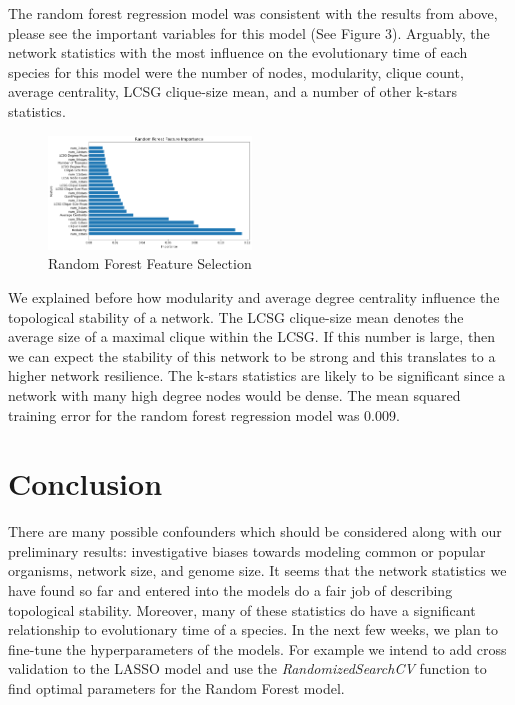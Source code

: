 \documentclass[12pt]{article}
\begin{document}
The random forest regression model was consistent with the results from above, please see the important variables for this model (See Figure 3). Arguably, the network statistics with the most influence on the evolutionary time of each species for this model were the number of nodes, modularity, clique count, average centrality, LCSG clique-size mean, and a number of other k-stars statistics. 
\begin{figure}
  \vspace{-20pt}
  \begin{center}
    \includegraphics[width=0.48\textwidth]{PPIN_fig2}
  \end{center}
  \vspace{-20pt}
  \caption{Random Forest Feature Selection}
  \vspace{-10pt}
\end{figure}

We explained before how modularity and average degree centrality influence the topological stability of a network. The LCSG clique-size mean denotes the average size of a maximal clique within the LCSG. If this number is large, then we can expect the stability of this network to be strong and this translates to a higher network resilience. The k-stars statistics are likely to be significant since a network with many high degree nodes would be dense. The mean squared training error for the random forest regression model was 0.009.

\section{Conclusion}
There are many possible confounders which should be considered along with our preliminary results: investigative biases towards modeling common or popular organisms, network size, and genome size. It seems that the network statistics we have found so far and entered into the models do a fair job of describing topological stability. Moreover, many of these statistics do have a significant relationship to evolutionary time of a species. In the next few weeks, we plan to fine-tune the hyperparameters of the models. For example we intend to add cross validation to the LASSO model and use the \textit{RandomizedSearchCV} function to find optimal parameters for the Random Forest model.
\end{document}
